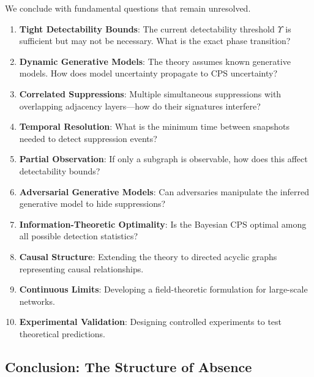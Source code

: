 \documentclass[12pt,a4paper]{article}
\theoremstyle{definition}
\theoremstyle{remark}
\newcommand{\Yharim}{\Upsilon}           %
\begin{document}
We conclude with fundamental questions that remain unresolved.

\begin{enumerate}
    \item \textbf{Tight Detectability Bounds}: The current detectability threshold $\Yharim$ is sufficient but may not be necessary. What is the exact phase transition?
    
    \item \textbf{Dynamic Generative Models}: The theory assumes known generative models. How does model uncertainty propagate to CPS uncertainty?
    
    \item \textbf{Correlated Suppressions}: Multiple simultaneous suppressions with overlapping adjacency layers—how do their signatures interfere?
    
    \item \textbf{Temporal Resolution}: What is the minimum time between snapshots needed to detect suppression events?
    
    \item \textbf{Partial Observation}: If only a subgraph is observable, how does this affect detectability bounds?
    
    \item \textbf{Adversarial Generative Models}: Can adversaries manipulate the inferred generative model to hide suppressions?
    
    \item \textbf{Information-Theoretic Optimality}: Is the Bayesian CPS optimal among all possible detection statistics?
    
    \item \textbf{Causal Structure}: Extending the theory to directed acyclic graphs representing causal relationships.
    
    \item \textbf{Continuous Limits}: Developing a field-theoretic formulation for large-scale networks.
    
    \item \textbf{Experimental Validation}: Designing controlled experiments to test theoretical predictions.
\end{enumerate}

\subsection{Conclusion: The Structure of Absence}
\end{document}
